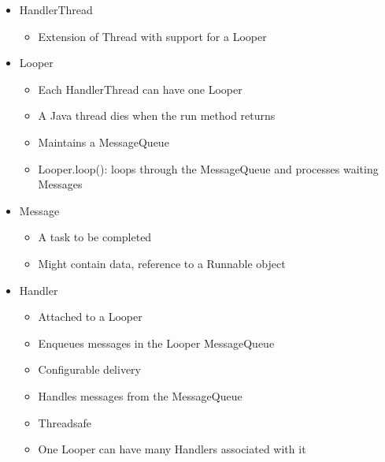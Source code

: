\documentclass{article}
\begin{document}
\begin{multicols}{2}

\begin{itemize}
  \item HandlerThread
  \begin{itemize}
    \item Extension of Thread with support for a Looper
  \end{itemize}
  \item Looper
  \begin{itemize}
    \item Each HandlerThread can have one Looper
    \item A Java thread dies when the run method returns
    \item Maintains a MessageQueue
    \item Looper.loop(): loops through the MessageQueue and processes waiting Messages
  \end{itemize}
  \item Message
  \begin{itemize}
    \item A	task	to	be	completed
    \item Might	contain	data,	reference	to	a	Runnable	object
  \end{itemize}
  \item Handler
  \begin{itemize}
    \item Attached to a Looper 
    \item Enqueues messages in the Looper MessageQueue
    \item Configurable delivery
    \item Handles messages from the MessageQueue
    \item Threadsafe
    \item  One Looper can have many Handlers associated with it
  \end{itemize}
\end{itemize}

\vfill\null


\end{multicols}
\end{document}
